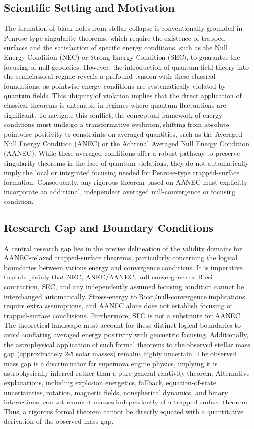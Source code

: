 \documentclass[conference]{IEEEtran}
\begin{document}
\subsection{Scientific Setting and Motivation}
The formation of black holes from stellar collapse is conventionally grounded in Penrose-type singularity theorems, which require the existence of trapped surfaces and the satisfaction of specific energy conditions, such as the Null Energy Condition (NEC) or Strong Energy Condition (SEC), to guarantee the focusing of null geodesics. However, the introduction of quantum field theory into the semiclassical regime reveals a profound tension with these classical foundations, as pointwise energy conditions are systematically violated by quantum fields. This ubiquity of violation implies that the direct application of classical theorems is untenable in regimes where quantum fluctuations are significant. To navigate this conflict, the conceptual framework of energy conditions must undergo a transformative evolution, shifting from absolute pointwise positivity to constraints on averaged quantities, such as the Averaged Null Energy Condition (ANEC) or the Achronal Averaged Null Energy Condition (AANEC). While these averaged conditions offer a robust pathway to preserve singularity theorems in the face of quantum violations, they do not automatically imply the local or integrated focusing needed for Penrose-type trapped-surface formation. Consequently, any rigorous theorem based on AANEC must explicitly incorporate an additional, independent averaged null-convergence or focusing condition.~\cite{cite_0ed84243cf171bc4}

\subsection{Research Gap and Boundary Conditions}
A central research gap lies in the precise delineation of the validity domains for AANEC-relaxed trapped-surface theorems, particularly concerning the logical boundaries between various energy and convergence conditions. It is imperative to state plainly that NEC, ANEC/AANEC, null convergence or Ricci contraction, SEC, and any independently assumed focusing condition cannot be interchanged automatically. Stress-energy to Ricci/null-convergence implications require extra assumptions, and AANEC alone does not establish focusing or trapped-surface conclusions. Furthermore, SEC is not a substitute for AANEC. The theoretical landscape must account for these distinct logical boundaries to avoid conflating averaged energy positivity with geometric focusing. Additionally, the astrophysical application of such formal theorems to the observed stellar mass gap (approximately 2-5 solar masses) remains highly uncertain. The observed mass gap is a discriminator for supernova engine physics, implying it is astrophysically inferred rather than a pure general relativity theorem. Alternative explanations, including explosion energetics, fallback, equation-of-state uncertainties, rotation, magnetic fields, nonspherical dynamics, and binary interactions, can set remnant masses independently of a trapped-surface theorem. Thus, a rigorous formal theorem cannot be directly equated with a quantitative derivation of the observed mass gap.
\end{document}
